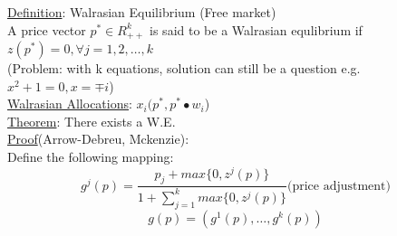 \documentclass[letterpaper,13pt,single,pdftex]{scrartcl}
\begin{document}
\underline{Definition}: Walrasian Equilibrium (Free market)\\
\hspace*{6mm}A price vector $p^* \in R^k_{++}$ is said to be a Walrasian equlibrium if $z(p^*) = 0, \forall j = 1,2,\dots, k$\\
\hspace*{6mm}(Problem: with k equations, solution can still be a question e.g. $x^2 +1 = 0, x=  \mp i $)\\
\underline{Walrasian Allocations}: $x_i(p^*, p^*\bullet w_i$)\\
\underline{Theorem}: There exists a W.E.\\
\underline{Proof}(Arrow-Debreu, Mckenzie):\\
Define the following mapping:
\[ g^j(p) = \frac{p_j+max\{0,z^j(p)\}}{1+\sum\limits_{j=1}^{k}max\{0,z^j(p)\}}\text{(price adjustment)}\]
\[g(p) = (g^1(p),\dots, g^k(p))\]
\end{document}
